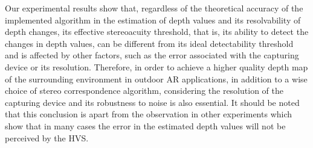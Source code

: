 \begin{itemize}
Our experimental results show that, regardless of the theoretical accuracy of the implemented algorithm in the estimation of depth values and its resolvability of depth changes,
its effective stereoacuity threshold, that is, its ability to detect the changes in depth values, can be different from its ideal detectability threshold and is affected by other factors, 
such as the error associated with the capturing device or its resolution. Therefore, in order to achieve a higher quality depth map of the surrounding environment in outdoor AR applications, 
in addition to a wise choice of stereo correspondence algorithm, considering the resolution of the capturing device and its robustness to noise
is also essential. It should be noted that this conclusion is apart from the observation in other experiments which show that in many cases
the error in the estimated depth values will not be perceived by the HVS.
\end{itemize}

